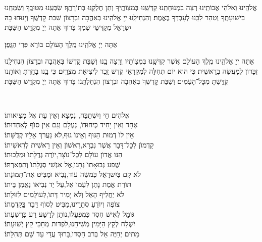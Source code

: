 \documentclass[twoside, openany, parskip=half, 11pt]{book}
\begin{document}
אֱלֹהֵֽינוּ וֵאלֹהֵי אֲבוֹתֵֽינוּ רְצֵה בִמְנוּחָתֵֽנוּ׃ קַדְּשֵֽׁנוּ בְּמִצְוֹתֶֽיךָ וְתֵן חֶלְקֵֽנוּ בְּתוֹרָתֶֽךָ׃ שַׂבְּעֵֽנוּ מִטּוּבֶֽךָ וְשַׂמְּחֵֽנוּ בִּישׁוּעָתֶֽךָ וְטַהֵר לִבֵּֽנוּ לְעׇבְדְּךָ בֶּאֱמֶת׃ וְהַנְחִילֵֽנוּ יְיָ אֱלֹהֵֽינוּ בְּאַהֲבָה וּבְרָצוֹן שַׁבַּת קׇדְשֶֽׁךָ וְיָנוּחוּ בָהּ יִשְׂרָאֵל מְקַדְּשֵׁי שְׁמֶךָ׃ בָּרוּךְ אַתָּה יְיָ מְקַדֵּשׁ הַשַּׁבָּת׃

\fullkaddish
\nextpage
{}

אַתָּה יְיָ אֱלֹהֵֽינוּ מֶֽלֶךְ הָעוֹלָם בּוֹרֵא פְּרִי הַגָּֽפֶן׃

אַתָּה יְיָ אֱלֹהֵֽינוּ מֶֽלֶךְ הָעוֹלָם אֲשֶׁר קִדְּשָֽׁנוּ בְּמִצְוֹתָיו וְרָֽצָה בָֽנוּ וְשַׁבַּת קָדְשׁוֹ בְּאַהֲבָה וּבְרָצוֹן הִנְחִילָֽנוּ זִכָּרוֹן לְמַעֲשֵׂה בְרֵאשִׁית׃ כִּי הוּא יוֹם תְּחִלָּה לְמִקְרָאֵי קֹֽדֶשׁ זֵֽכֶר לִיצִיאַת מִצְרָֽיִם׃ כִּי בָֽנוּ בָחַֽרְתָּ וְאוֹתָֽנוּ קִדַּֽשְׁתָּ מִכׇּל־הָעַמִּים׃ וְשַׁבַּת קׇדְשְׁךָ בְּאַהֲבָה וּבְרָצוֹן הִנְחַלְתָּֽנוּ׃ בָּרוּךְ אַתָּה יְיָ מְקַדֵּשׁ הַשַּׁבָּת׃

\aleinu

\ledavid
\\
\mournerskaddish
\nextpage
{}



אֱלהִים חַי וְיִשְׁתַּבַּח, \hfill נִמְצָא וְאֵין עֵת אֶל מְצִיאוּתוֹ׃ \\
אֶחָד וְאֵין יָחִיד כְּיִחוּדוׂ, \hfill נֶעְלָם וְגַם אֵין סוׂף לְאַחְדוּתוֹ׃ \\
אֵין לוׂ דְמוּת הַגּוּף וְאֵינוׂ גוּף,\hfill לׂא נַעֲרךְ אֵלָיו קְדֻשָּׁתוֹ׃ \\
קַדְמוׂן לְכׇל־דָּבָר אֲשֶׁר נִבְרָא,\hfill רִאשׁוׂן וְאֵין רֵאשִׁית לְרֵאשִׁיתוֹ׃ \\
הִנּו אֲדוׂן עוׂלָם לְכׇל־נוׂצָר,\hfill יוׂרֶה גְדֻלָּתוׂ וּמַלְכוּתוֹ׃ \\
שֶׁפַע נְבוּאָתוׂ נְתָנוׂ,\hfill אֶל אַנְשֵׁי סְגֻלָּתוׂ וְתִפְאַרְתּוֹ׃ \\
לׂא קָם בְּיִשרָאֵל כְּמשֶׁה עוׂד,\hfill נָבִיא וּמַבִּיט אֶת־תְּמוּנָתוֹ׃ \\
תּוׂרַת אֱמֶת נָתַן לְעַמּוׂ אֵל,\hfill עַל יַד נְבִיאוׂ נֶאֱמַן בֵּיתוֹ׃ \\
לׂא יַחֲלִיף הָאֵל וְלׂא יָמִיר דָּתוׂ,\hfill לְעוׂלָמִים לְזוּלָתוֹ׃ \\
צוׂפֶה וְיוׂדֵעַ סְתָרֵינוּ,\hfill מַבִּיט לְסוׂף דָּבָר בְְַּקַדְמָתוֹ׃ \\
גּוׂמֵל לְאִישׁ חֶסֶד כְּמִפְעָלוׂ,\hfill נוׂתֵן לְרָשָׁע רַע כְּרִשְׁעָתוֹ׃ \\
יִשְׁלַח לְקֵץ הַיָּמִין מְשִׁיחֵנוּ,\hfill לִפְדּות מְחַכֵּי קֵץ יְשׁוּעָתוֹ׃ \\
מֵתִים יְחַיֶּה אֵל בְּרב חַסְדּוׂ,\hfill בָּרוּךְ עֲדֵי עַד שֵׁם תְּהִלָּתוֹ׃\\
\end{document}
